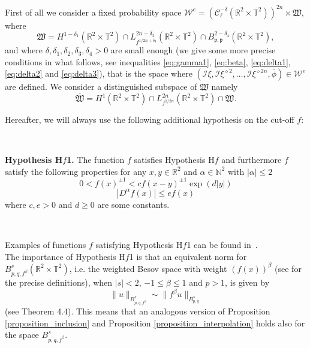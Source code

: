 \documentclass[a4paper,10pt]{article}
\newcommand{\tmstrong}[1]{\textbf{#1}}
\begin{document}
First of all we consider a fixed probability space $\mathcal{W}^e =
(\mathcal{C}^{- \delta}_{\ell} (\mathbb{R}^2 \times \mathbb{T}^2))^{2 n}
\times \mathfrak{W}$, where
\[ \mathfrak{W} = H^{1 - \delta_1} (\mathbb{R}^2 \times \mathbb{T}^2) \cap
   L^{2 n - \delta_2}_{f^{1 / 2 n + \delta_3}} (\mathbb{R}^2 \times
   \mathbb{T}^2) \cap B^{2 - \delta_4}_{\mathfrak{p}, \mathfrak{p}}
   (\mathbb{R}^2 \times \mathbb{T}^2), \]
and where $\delta, \delta_1, \delta_2, \delta_3, \delta_4 > 0$ are small
enough (we give some more precise conditions in what follows, see inequalities
{\eqref{eq:gamma1}}, {\eqref{eq:beta}}, {\eqref{eq:delta1}},
{\eqref{eq:delta2}} and {\eqref{eq:delta3}}), that is the space where
$(\mathcal{I} \xi, \mathcal{I} \xi^{\diamond 2}, \ldots, \mathcal{I}
\xi^{\diamond 2 n}, \bar{\phi}) \in \mathcal{W}^e$ are defined. We consider a
distinguished subspace of $\mathfrak{W}$ namely
\[ \overline{\mathfrak{W}} = H^1 (\mathbb{R}^2 \times \mathbb{T}^2) \cap L^{2
   n}_{f^{1 / 2 n}} (\mathbb{R}^2 \times \mathbb{T}^2) \cap \mathfrak{W} . \]
   
\begin{remark}
  \label{remark_f}Hereafter, we will always use the following additional
  hypothesis on the cut-off $f$:
  
  \
  
  {\tmstrong{Hypothesis H$f$1.}} The function $f$ satisfies Hypothesis H$f$
  and furthermore $f$ satisfy the following properties for any $x, y \in
  \mathbb{R}^2$ and $\alpha \in \mathbb{N}^2$ with $| \alpha | \leq 2$
  \[ 0 < f (x)^{\pm 1} < c f (x - y)^{\pm 1} \exp (d | y |) \]
  \[ | D^{\alpha} f (x) | \leqslant e f (x) \]
  where $c, e > 0$ and $d \geqslant 0$ are some constants.
  
   \
  
  Examples of functions $f$ satisfying Hypothesis H$f$1 can be found
  in~{\cite{Klein1984}}.\\
  The importance of Hypothesis H$f$1 is that an equivalent norm for $B^s_{p,
  q, f^{\beta}} (\mathbb{R}^2 \times \mathbb{T}^2)$, i.e. the weighted Besov
  space with weight $(f (x))^{\beta}$ (see {\cite{Schott1,Schott2}} for the
  precise definitions), when $| s | < 2$, $- 1 \leqslant \beta \leqslant 1$
  and $p > 1$, is given by
  \[ \| u \|_{B^s_{p, q, f^{\beta}}} \sim \| f^{\beta} u \|_{B^s_{p, q}} \]
  (see {\cite{Schott2}} Theorem 4.4). This means that an analogous version of
  Proposition \ref{proposition_inclusion} and Proposition
  \ref{proposition_interpolation} holds also for the space $B^s_{p, q,
  f^{\beta}}$.  
\end{remark}
\end{document}
